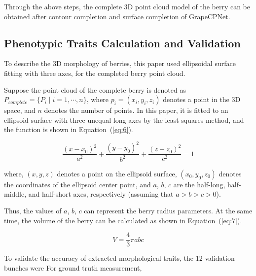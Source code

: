 \documentclass[12pt]{article}
\begin{document}
Through the above steps, the complete 3D point cloud model of the berry can be obtained after contour completion and surface completion of GrapeCPNet.

\subsection{Phenotypic Traits Calculation and Validation}

To describe the 3D morphology of berries, this paper used ellipsoidal surface fitting with three axes, for the completed berry point cloud.


Suppose the point cloud of the complete berry is denoted as $P_{complete}=\{P_i \mid i=1, \cdots,n\}$, where $p_i=(x_i,y_i,z_i)$ denotes a point in the 3D space, and $n$ denotes the number of points. 
In this paper, it is fitted to an ellipsoid surface with three unequal long axes by the least squares method, and the function is shown in Equation~(\ref{eq:6}).

\begin{equation}
    \frac{(x-x_0)^2}{a^2} + \frac{(y-y_0)^2}{b^2} + \frac{(z-z_0)^2}{c^2} = 1
    \label{eq:6}
\end{equation}

{\raggedright where, $(x,y,z)$ denotes a point on the ellipsoid surface, $(x_0,y_0,z_0)$ denotes the coordinates of the ellipsoid center point, and $a$, $b$, $c$ are the half-long, half-middle, and half-short axes, respectively (assuming that $a>b>c>0$). }

Thus, the values of $a$, $b$, $c$ can represent the berry radius parameters. 
At the same time, the volume of the berry can be calculated as shown in Equation~(\ref{eq:7}).

\begin{equation}
    V=\frac{4}{3} \pi a b c
    \label{eq:7}
\end{equation}

To validate the accuracy of extracted morphological traits, the 12 validation bunches  were  
For ground truth measurement, 
\end{document}
